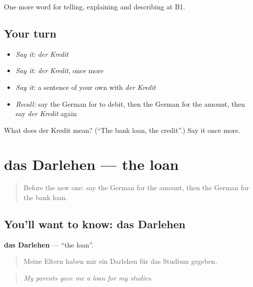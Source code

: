 \begin{grammarlens}[title={What you've built}]
One more word for telling, explaining and describing at B1.
\end{grammarlens}

\subsection*{Your turn}
\begin{itemize}
\raggedright
  \item \emph{Say it:} \emph{der Kredit}
  \item \emph{Say it:} \emph{der Kredit}, once more
  \item \emph{Say it:} a sentence of your own with \emph{der Kredit}
  \item \emph{Recall:} say the German for to debit, then the German for the amount, then say \emph{der Kredit} again
\end{itemize}

\begin{tcolorbox}[breakable,colback=teal!4,colframe=teal!35!black,title={Before you move on}]
What does der Kredit mean? (\textquotedblleft{}The bank loan, the credit\textquotedblright{}.) Say it once more.
\end{tcolorbox}
\section[das Darlehen]{das Darlehen — the loan}

\label{lesson:GE-C388-darlehen}



\begin{quote}
Before the new one: say the German for the amount, then the German for the bank loan.
\end{quote}

\subsection*{You'll want to know: das Darlehen}
\textbf{das Darlehen} — \textquotedblleft{}the loan\textquotedblright{}.

\begin{quote}
Meine Eltern haben mir ein Darlehen für das Studium gegeben.
\end{quote}

\begin{quote}
\emph{My parents gave me a loan for my studies.}
\end{quote}

